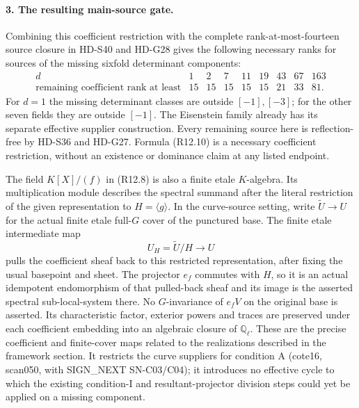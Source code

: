 \paragraph{3. The resulting main-source gate.}
Combining this coefficient restriction with the complete
rank-at-most-fourteen source closure in HD-S40 and HD-G28
gives the following necessary ranks for sources of the missing
sixfold determinant components:
\[
\begin{array}{c|rrrrrrrr}
 d&1&2&7&11&19&43&67&163\\\hline
 \text{remaining coefficient rank at least}
   &15&15&15&15&15&21&33&81.
\end{array}                                                   \tag{R12.10}
\]
For \(d=1\) the missing determinant classes are outside
\([-1],[-3]\); for the other seven fields they are outside
\([-1]\). The Eisenstein family already has its separate
effective supplier construction. Every remaining source here is
reflection-free by HD-S36 and HD-G27. Formula (R12.10) is a
necessary coefficient restriction, without an existence or
dominance claim at any listed endpoint.

The field \(K[X]/(f)\) in (R12.8) is also a finite etale
\(K\)-algebra. Its multiplication module describes the spectral
summand after the literal restriction of the given representation
to \(H=\langle g\rangle\). In the curve-source setting, write
\(\widetilde U\to U\) for the actual finite etale full-\(G\)
cover of the punctured base. The finite etale intermediate map
\[
                   U_H=\widetilde U/H\longrightarrow U
                                                               \tag{R12.11}
\]
pulls the coefficient sheaf back to this restricted representation,
after fixing the usual basepoint and sheet. The projector \(e_f\)
commutes with \(H\), so it is an actual idempotent endomorphism
of that pulled-back sheaf and its image is the asserted spectral
sub-local-system there. No \(G\)-invariance of \(e_fV\) on
the original base is asserted. Its characteristic factor, exterior
powers and traces are preserved under each coefficient embedding
into an algebraic closure of \(\mathbb Q_\ell\). These are
the precise coefficient and finite-cover maps related to the
realizations described in the framework section.
It restricts the curve suppliers for condition A (cote16,
scan050, with SIGN\_NEXT SN-C03/C04); it introduces no effective
cycle to which the existing condition-I and resultant-projector
division steps could yet be applied on a missing component.
